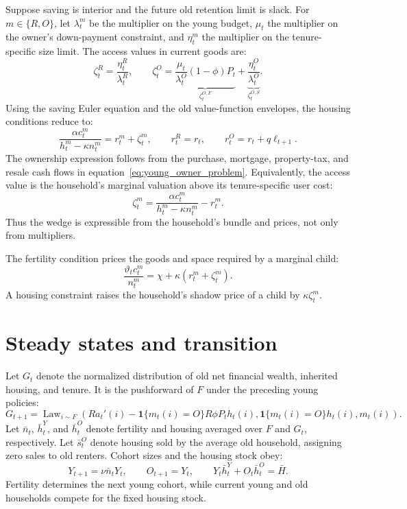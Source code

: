 \documentclass[10pt]{article}
\theoremstyle{definition}
\begin{document}
Suppose saving is interior and the future old retention limit is slack. For
$m\in\{R,O\}$, let
$\lambda_t^m$ be the multiplier on the young budget, $\mu_t$ the multiplier on
the owner's down-payment constraint, and $\eta_t^m$ the multiplier on the
tenure-specific size limit. The access values in current goods are:
\begin{equation}
 \zeta_t^R=\frac{\eta_t^R}{\lambda_t^R},\qquad
 \zeta_t^O=
 \underbrace{\frac{\mu_t}{\lambda_t^O}(1-\phi)P_t}_{\zeta_t^{O,F}}
 +\underbrace{\frac{\eta_t^O}{\lambda_t^O}}_{\zeta_t^{O,S}}.
 \label{eq:access_values}
\end{equation}
Using the saving Euler equation and the old value-function envelopes, the
housing conditions reduce to:
\begin{equation}
 \frac{\alpha c_t^m}{h_t^m-\kappa n_t^m}
 =r_t^m+\zeta_t^m,\qquad
 r_t^R=r_t,\qquad r_t^O=r_t+q\ell_{t+1}.
 \label{eq:housing_foc}
\end{equation}
The ownership expression follows from the purchase, mortgage, property-tax,
and resale cash flows in equation~\eqref{eq:young_owner_problem}.
Equivalently, the access value is the household's marginal valuation above its
tenure-specific user cost:
\begin{equation}
 \zeta_t^m=
 \frac{\alpha c_t^m}{h_t^m-\kappa n_t^m}-r_t^m.
 \label{eq:observable_access_value}
\end{equation}
Thus the wedge is expressible from the household's bundle and prices, not only
from multipliers.

The fertility condition prices the goods and space required by a marginal
child:
\begin{equation}
 \frac{\vartheta_t c_t^m}{n_t^m}
 =\chi+\kappa(r_t^m+\zeta_t^m).
 \label{eq:fertility_foc}
\end{equation}
A housing constraint raises the household's shadow price of a child by
$\kappa\zeta_t^m$.

\section{Steady states and transition}

Let $G_t$ denote the normalized distribution of old net financial wealth,
inherited housing, and tenure. It is the pushforward of $F$ under the preceding
young policies:
\begin{equation}
 G_{t+1}=\operatorname{Law}_{i\sim F}\!\left(
 Ra_t'(i)-\mathbf 1\{m_t(i)=O\}R\phi P_th_t(i),
 \mathbf 1\{m_t(i)=O\}h_t(i),m_t(i)\right).
 \label{eq:old_distribution}
\end{equation}
Let $\bar n_t$, $\bar h_t^Y$, and $\bar h_t^O$ denote fertility and housing
averaged over $F$ and $G_t$, respectively.
Let $\bar s_t^O$ denote housing sold by the average old household, assigning
zero sales to old renters. Cohort sizes and the housing stock obey:
\begin{equation}
 Y_{t+1}=\nu\bar n_tY_t,\qquad O_{t+1}=Y_t,
 \qquad Y_t\bar h_t^Y+O_t\bar h_t^O=\bar H.
 \label{eq:cohort_and_housing}
\end{equation}
Fertility determines the next young cohort, while current young and old
households compete for the fixed housing stock.
\end{document}
